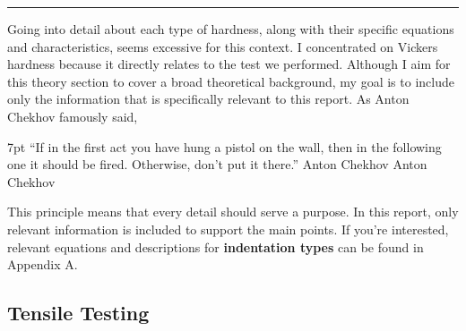 \documentclass{article}
\newcommand{\formalsource}{} %
\newenvironment{formal}[1][]{%
    \renewcommand{\formalsource}{#1}%
    \def\FrameCommand{%
        \hspace{1pt}%
        {\color{darkblue}\vrule width 2pt}%
        {\color{formalshade}\vrule width 4pt}%
        \colorbox{formalshade}%
    }%
    \MakeFramed{\advance\hsize-\width\FrameRestore}%
    \noindent\hspace{-4.55pt}%
    \begin{adjustwidth}{}{7pt}%
        \vspace{2pt}%
    }%
    {%
        \vspace{4pt}%
        \ifx\formalsource\empty %
        \else
        \hfill{\footnotesize{\formalsource}}%
        \fi
    \end{adjustwidth}\endMakeFramed%
}
\begin{document}
    \hrule\vspace{1em}
    Going into detail about each type of hardness, along with their specific equations and characteristics, seems excessive for this context. I concentrated on Vickers hardness because it directly relates to the test we performed. Although I aim for this theory section to cover a broad theoretical background, my goal is to include only the information that is specifically relevant to this report. As Anton Chekhov famously said, \begin{formal}[Anton Chekhov]{“If in the first act you have hung a pistol on the wall, then in the following one it should be fired. Otherwise, don't put it there.”}\end{formal} This principle means that every detail should serve a purpose. In this report, only relevant information is included to support the main points. If you're interested, relevant equations and descriptions for \textbf{indentation types} can be found in Appendix A.
    
    \newpage

    \subsection{Tensile Testing}
    
\end{document}
